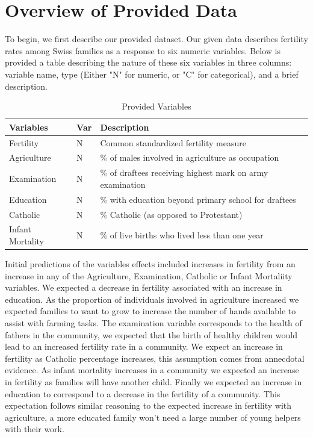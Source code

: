 \documentclass[preprint,12pt]{elsarticle}
\begin{document}

\section*{Overview of Provided Data}
\label{S:1}

To begin, we first describe our provided dataset. Our given data describes fertility rates among Swiss families as a response to six numeric variables. Below is provided a table describing the nature of these six variables in three columns: variable name, type (Either "N" for numeric, or "C" for categorical), and a brief description.

\begin{table}[h]
\centering
\begin{tabular}{l l l}
\hline
\textbf{Variables} & \textbf{Var} & \textbf{Description}\\
\hline
Fertility & N & Common standardized fertility measure \\
Agriculture & N & \% of males involved in agriculture as occupation \\
Examination & N & \% of draftees receiving highest mark on army examination \\
Education & N & \% with education beyond primary school for draftees \\
Catholic & N & \% Catholic (as opposed to Protestant) \\
Infant Mortality & N & \% of live births who lived less than one year \\
\hline
\end{tabular}
\caption{Provided Variables}
\end{table}

Initial predictions of the variables effects included increases in fertility from an increase in any of the Agriculture, Examination, Catholic or Infant Mortaliity variables. We expected a decrease in fertility associated with an increase in education. As the proportion of individuals involved in agriculture increased we expected families to want to grow to increase the number of hands available to assist with farming tasks. The examination variable corresponds to the health of fathers in the community, we expected that the birth of healthy children would lead to an increased fertility rate in a community. We expect an increase in fertility as Catholic percentage increases, this assumption comes from annecdotal evidence. As infant mortality increases in a community we expected an increase in fertility as families will have another child. Finally we expected an increase in education to correspond to a decrease in the fertility of a community. This expectation follows similar reasoning to the expected increase in fertility with agriculture, a more educated family won't need a large number of young helpers with their work.\\
\end{document}
